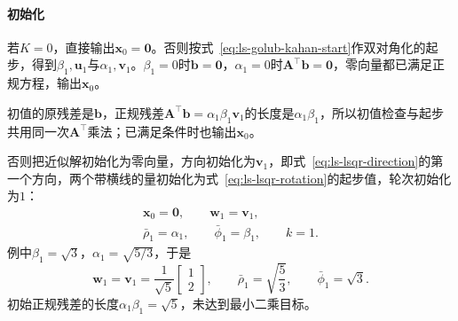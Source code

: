 \paragraph{初始化}
若$K=0$，直接输出$\bm x_0=\bm0$。否则按式~\eqref{eq:ls-golub-kahan-start}作双对角化的起步，得到$\beta_1,\bm u_1$与$\alpha_1,\bm v_1$。$\beta_1=0$时$\bm b=\bm0$，$\alpha_1=0$时$\bm A^\top\bm b=\bm0$，零向量都已满足正规方程，输出$\bm x_0$。

初值的原残差是$\bm b$，正规残差$\bm A^\top\bm b=\alpha_1\beta_1\bm v_1$的长度是$\alpha_1\beta_1$，所以初值检查与起步共用同一次$\bm A^\top$乘法；已满足条件时也输出$\bm x_0$。

否则把近似解初始化为零向量，方向初始化为$\bm v_1$，即式~\eqref{eq:ls-lsqr-direction}的第一个方向，两个带横线的量初始化为式~\eqref{eq:ls-lsqr-rotation}的起步值，轮次初始化为$1$：
\[
 \begin{gathered}
 \bm x_0=\bm0,\qquad \bm w_1=\bm v_1,\\
 \bar\rho_1=\alpha_1,\qquad \bar\phi_1=\beta_1,\qquad k=1 .
 \end{gathered}
\]
例中$\beta_1=\sqrt3$，$\alpha_1=\sqrt{5/3}$，于是
\[
 \bm w_1=\bm v_1=\frac1{\sqrt5}\begin{bmatrix}1\\2\end{bmatrix},\qquad
 \bar\rho_1=\sqrt{\frac53},\qquad \bar\phi_1=\sqrt3 .
\]
初始正规残差的长度$\alpha_1\beta_1=\sqrt5$，未达到最小二乘目标。


